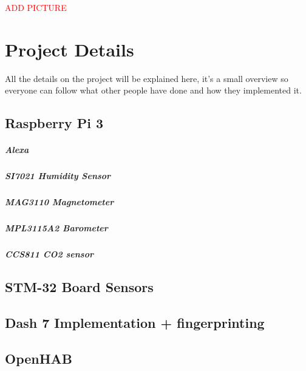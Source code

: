 \documentclass[a4paper,notitlepage]{article}
\begin{document}
\textcolor{red}{ADD PICTURE}

\section*{Project Details}

All the details on the project will be explained here, it's a small overview so everyone can follow what other people have done and how they implemented it.

\subsection*{Raspberry Pi 3}

	\subparagraph*{Alexa}
	
	\subparagraph*{SI7021 Humidity Sensor}
	
	\subparagraph*{MAG3110 Magnetometer}
	
	\subparagraph*{MPL3115A2 Barometer}
	
	\subparagraph*{CCS811 CO2 sensor}

\subsection*{STM-32 Board Sensors}

\subsection*{Dash 7 Implementation + fingerprinting}

\subsection*{OpenHAB}
\end{document}
